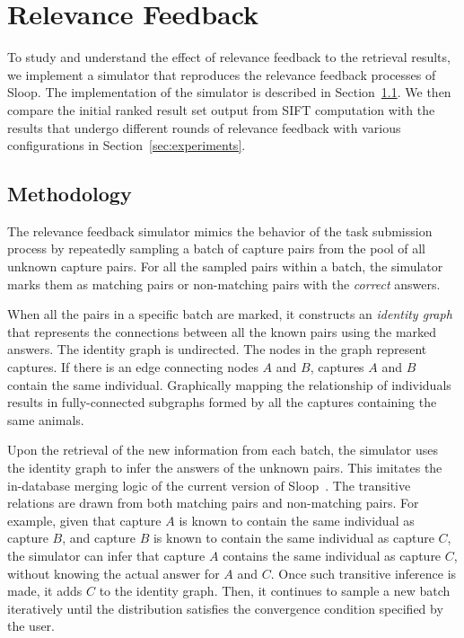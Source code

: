 \graphicspath{{./images/chap4/}}
\chapter{Relevance Feedback}
\label{chap:relevance_feedback}

To study and understand the effect of relevance feedback to the retrieval
results, we implement a simulator that reproduces the relevance feedback
processes of Sloop. The implementation of the simulator is described in
Section~\ref{sec:method}. We then compare the initial ranked result set
output from SIFT computation with the results that undergo different rounds
of relevance feedback with various configurations in
Section~\ref{sec:experiments}.

\section{Methodology}
\label{sec:method}

The relevance feedback simulator mimics the behavior of the task submission
process by repeatedly sampling a batch of capture pairs from the pool of
all unknown capture pairs. For all the sampled pairs within a batch, the
simulator marks them as matching pairs or non-matching pairs with the
\emph{correct} answers.

When all the pairs in a specific batch are marked, it constructs an
\emph{identity graph} that represents the connections between all the known
pairs using the marked answers. The identity graph is undirected. The nodes in
the graph represent captures. If there is an edge connecting nodes $A$
and $B$, captures $A$ and $B$ contain the same individual. Graphically mapping
the relationship of individuals results in fully-connected subgraphs formed by
all the captures containing the same animals.

Upon the retrieval of the new information from each batch, the simulator uses
the identity graph to infer the answers of the unknown pairs. This imitates the
in-database merging logic of the current version of Sloop~\cite{sloopdocs}. The
transitive relations are drawn from both matching pairs and non-matching pairs.
For example, given that capture $A$ is known to contain the same individual as
capture $B$, and capture $B$ is known to contain the same individual as
capture $C$, the simulator can infer that capture $A$ contains the same
individual as capture $C$, without knowing the actual answer for
$A$ and $C$. Once such transitive inference is made, it adds $C$ to the
identity graph. Then, it continues to sample a new batch iteratively until the
distribution satisfies the convergence condition specified by the user.

